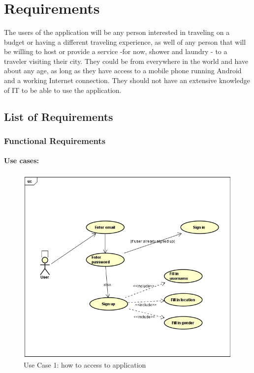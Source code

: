 \documentclass[paper=a4, fontsize=12pt,DIV=14]{scrartcl}    %
\begin{document}
    \newpage
        \section{Requirements}
        	\paragraph{}The users of the application will be any person interested in traveling on a budget or having a different traveling experience, as well of any person that will be willing to host or provide a service -for now, shower and laundry - to a traveler visiting their city. They could be from everywhere in the world and have about any age, as long as they have access to a mobile phone running Android and a working Internet connection. They should not have an extensive knowledge of IT to be able to use the application.
        	\subsection{List of Requirements}
        		\subsubsection{Functional Requirements}
        			\paragraph{Use cases:}
        			\paragraph{}

		                \begin{figure}[!htbp]
		                    \center
		                    \includegraphics[scale=0.75]{img/enter_application.png}
		                    \caption{Use Case 1: how to access to application}
		                \end{figure}
\end{document}
